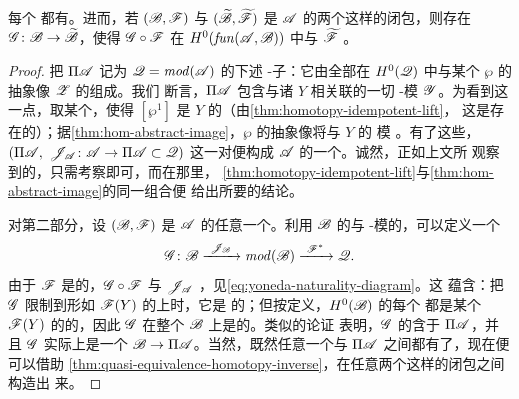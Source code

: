 \begin{lemma}\label{thm:split-closure-existence}
每个 \trACategory{}都有\trSplitClosure。进而，若 $(\mathscr{B},\mathscr{F})$ 与
$(\widetilde{\mathscr{B}},\widetilde{\mathscr{F}})$ 是 $\mathscr{A}$ 的两个这样的闭包，则存在%
\trQuasiequivalence{} $\mathscr{G}\colon\mathscr{B}\to\widetilde{\mathscr{B}}$，使得
$\mathscr{G}\circ\mathscr{F}$ 在 $H^0(\mathit{fun}(\mathscr{A},\mathscr{B}))$ 中与
$\widetilde{\mathscr{F}}$ \trIsomorphic。
\end{lemma}
\begin{proof}
把 $\Pi\mathscr{A}$ 记为 $\mathscr{Q}=\mathit{mod}(\mathscr{A})$ 的下述\trFull{}
\trAinfty-子\trCategory：它由全部在 $H^0(\mathscr{Q})$ 中与某个\trHomotopy%
\trIdempotent{} $\wp$ 的抽象像 $\mathscr{Z}$ \trIsomorphic{}的\trObject{}组成。我们
断言，$\Pi\mathscr{A}$ 包含与诸\trObject{} $Y$ 相关联的一切\trYoneda{}
\trAinfty-模 $\mathscr{Y}$。为看到这一点，取某个\trHomotopy\trIdempotent，使得
$[\wp^1]$ 是 $Y$ 的\trIdentityMorphism（由\cref{thm:homotopy-idempotent-lift}，
这是存在的）；据\cref{thm:hom-abstract-image}，$\wp$ 的抽象像将与 $Y$ 的%
\trYoneda{}模%
\trIsomorphic。有了这些，$(\Pi\scr{A},\ \scr{J}_{\scr{A}}\colon\scr{A}\to
\Pi\scr{A}\subset\scr{Q})$ 这一对便构成 $\mathscr{A}$ 的一个\trSplitClosure。诚然，正如上文所
观察到的，只需考察\trCohomology\trCategory{}即可，而在那里，
\cref{thm:homotopy-idempotent-lift}与\cref{thm:hom-abstract-image}的同一组合便
给出所要的结论。

对第二部分，设 $(\mathscr{B},\mathscr{F})$ 是 $\mathscr{A}$ 的任意一个\trSplitClosure。利用
$\mathscr{B}$ 的\trYonedaEmbedding{}与 \trAinfty-模的\trPullback，可以定义一个%
\trAFunctor
\begin{equation*}
\scr{G}\colon\scr{B}\xrightarrow{\ \scr{J}_{\scr{B}}\ }\mathit{mod}(\scr{B})
\xrightarrow{\ \scr{F}^*\ }\scr{Q}.
\end{equation*}
由于 $\mathscr{F}$ 是\trCohomology\trFullyFaithful{}的，$\mathscr{G}\circ\mathscr{F}$ 与
$\mathscr{J}_{\mathscr{A}}$ \trIsomorphic，见\eqref{eq:yoneda-naturality-diagram}。这
蕴含：把 $\mathscr{G}$ 限制到形如 $\mathscr{F}(Y)$ 的\trObject{}上时，它是%
\trCohomology\trFullyFaithful{}的；但按定义，$H^0(\mathscr{B})$ 的每个\trObject{}%
都是某个 $\mathscr{F}(Y)$ 的\trIdempotent{}\trEndomorphism{}的\trImage，因此
$\mathscr{G}$ 在整个 $\mathscr{B}$ 上是\trCohomology\trFullyFaithful{}的。类似的论证
表明，$\mathscr{G}$ 的\trImage{}含于 $\Pi\mathscr{A}$，并且 $\mathscr{G}$ 实际上是一个%
\trQuasiequivalence{} $\mathscr{B}\to\Pi\mathscr{A}$。当然，既然任意一个\trSplitClosure{}与
$\Pi\mathscr{A}$ 之间都有了\trQuasiequivalence，现在便可以借助%
\cref{thm:quasi-equivalence-homotopy-inverse}，在任意两个这样的闭包之间构造出%
\trQuasiequivalence{}来。
\end{proof}

